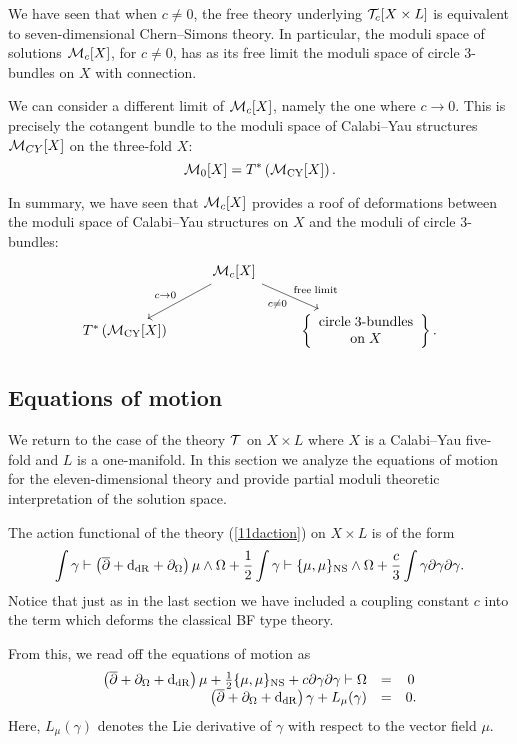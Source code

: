 \documentclass[11pt]{amsart}
\begin{document}
We have seen that when $c \ne 0$, the free theory underlying $\mathcal T_c[X \times L]$ is equivalent to seven-dimensional Chern--Simons theory.
In particular, the moduli space of solutions $\mathcal M_c[X]$, for $c \ne 0$, has as its free limit the moduli space of circle $3$-bundles on $X$ with connection.

We can consider a different limit of $\mathcal M_c[X]$, namely the one where $c \to 0$.
This is precisely the cotangent bundle to the moduli space of Calabi--Yau structures $\mathcal M_{CY}[X]$ on the three-fold $X$:
\[
  \mathcal M_0[X] = T^* \left(\mathcal M_{\rm CY} [X]\right) .
\]

In summary, we have seen that $\mathcal M_c[X]$ provides a roof of deformations between the moduli space of Calabi--Yau structures on $X$ and the moduli of circle $3$-bundles:
\[
  \begin{tikzcd}
    & \cM_c[X] \ar[dr, "c \ne 0"', "{\rm free\;limit}"] \ar[dl, "c \to 0"'] & \\ T^* \left(\cM_{\rm CY} [X] \right) & & \left\{ \begin{array}{ccc} \mbox{circle\;3-bundles} \\ {\rm on} \; X \end{array} \right\} .
  \end{tikzcd}
\]


\subsection{Equations of motion}
\label{sec:org2973a4d}
We return to the case of the theory $\mathcal T$ on $X\times L$ where $X$ is a Calabi--Yau five-fold and $L$ is a one-manifold.
In this section we analyze the equations of motion for the eleven-dimensional theory and provide partial moduli theoretic interpretation of the solution space.

The action functional of the theory (\ref{11daction}) on $X \times L$ is of the form
\[
  \int \gamma \vdash \left(\overline{\partial} + {\rm d}_{\rm dR} + \partial_{\Omega}\right) \mu \wedge \Omega + \frac12 \int \gamma \vdash \{\mu,\mu\}_{\rm NS} \wedge \Omega + \frac{c}{3} \int \gamma \partial \gamma \partial \gamma .
\]
Notice that just as in the last section we have included a coupling constant $c$ into the term which deforms the classical BF type theory.

From this, we read off the equations of motion as
\begin{equation}\label{eqn:eom}
  \begin{array}{rccc}
    \left(\overline{\partial} + \partial_\Omega + {\rm d}_{\rm dR} \right) \mu + \frac12 \{\mu, \mu\}_{\rm NS} + c \partial \gamma \partial \gamma \vdash \Omega & = & 0 \\
    \left(\overline{\partial} + \partial_\Omega + {\rm d}_{\rm dR} \right) \gamma + L_\mu (\gamma) & = & 0 .
  \end{array}
\end{equation}
Here, $L_\mu(\gamma)$ denotes the Lie derivative of $\gamma$ with respect to the vector field $\mu$.
\end{document}
